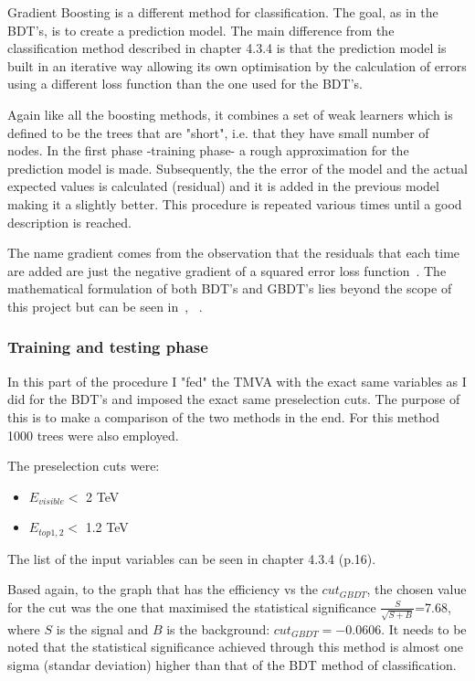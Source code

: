 \documentclass[12pt,a4paper]{report}
\begin{document}
Gradient Boosting is a different method for classification. The goal, as in the BDT's, is to create a 
prediction model. The main difference from the classification method described in chapter 4.3.4 is that 
the prediction model is built in an iterative way allowing its own optimisation by the calculation of errors
using a different loss function than the one used for the BDT's.

Again like all the boosting methods, it combines a set of weak learners which is defined to be the trees that
are "short", i.e. that they have small number of nodes.
In the first phase -training phase- a rough approximation for the prediction model is made. Subsequently, the 
the error of the model and the actual expected values is calculated (residual) and it is added in the
previous model making it a slightly  better. This procedure is repeated various times until a good description
is reached. 

The name gradient comes from the observation that the residuals that each time are added are just the 
negative gradient of a squared error loss function~\cite{hoecker2007tmva}. The mathematical formulation of 
both BDT's and GBDT's lies beyond the scope of this project but can be seen in~\cite{schapire1999brief},
~\cite{hoecker2007tmva}.


\subsubsection{Training and testing phase}

In this part of the procedure I "fed" the TMVA with the exact same variables as I did for the BDT's and 
imposed the exact same preselection cuts. The purpose of this is to make a comparison of the two methods in 
the end. For this method 1000 trees were also employed.

The preselection cuts were:

\begin{itemize}
 \item $E_{visible} <$ 2 TeV
 \item $E_{top1,2} <$ 1.2 TeV
\end{itemize}

The list of the input variables can be seen in chapter 4.3.4 (p.16).

Based again, to the graph that has the efficiency vs the $cut_{GBDT}$, the chosen value for the cut was the one
that maximised the statistical significance $\frac{S}{\sqrt{S+B}}$=7.68, where $S$ is the signal and $B$ is the 
background: $cut_{GBDT}=-0.0606$. It needs to be noted that the statistical significance achieved through
this method is almost one sigma (standar deviation) higher than that of the BDT method of classification.
\end{document}

